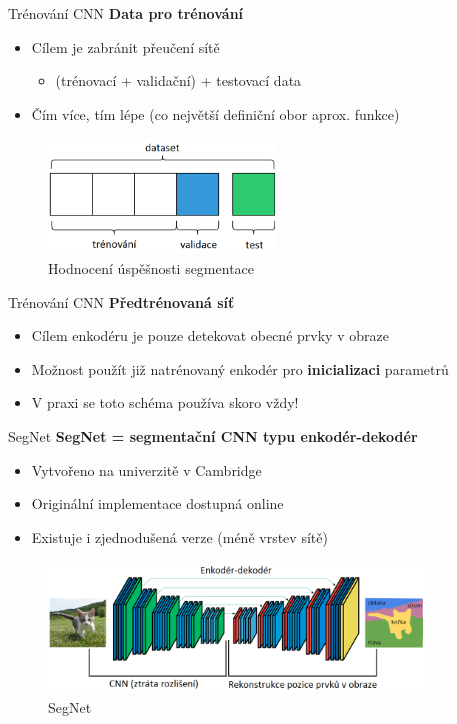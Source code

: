 \documentclass[aspectratio=1610]{beamer}
\begin{document}
\begin{frame}{Trénování CNN}
\textbf{Data pro trénování}
\begin{itemize}
	\item Cílem je zabránit přeučení sítě
	\begin{itemize}
		\item (trénovací + validační) + testovací data
	\end{itemize}
	\item Čím více, tím lépe (co největší definiční obor aprox. funkce)
\end{itemize}
\begin{figure}[h]
	\begin{center}
		\includegraphics[width=6cm, keepaspectratio]{dataset.png}
	\end{center}
	\caption{Hodnocení úspěšnosti segmentace} 	
\end{figure}

\end{frame}
\begin{frame}{Trénování CNN}
\textbf{Předtrénovaná síť}
\begin{itemize}
	\item Cílem enkodéru je pouze detekovat obecné prvky v obraze
	\item Možnost použít již natrénovaný enkodér pro \textbf{inicializaci} parametrů
	\item V praxi se toto schéma používa skoro vždy!
\end{itemize}
\end{frame}
\begin{frame}{SegNet}
\textbf{SegNet = segmentační CNN typu enkodér-dekodér}
\begin{itemize}
	\item Vytvořeno na univerzitě v Cambridge
	\item Originální implementace dostupná online	
	\item Existuje i zjednodušená verze (méně vrstev sítě)
\end{itemize}
\begin{figure}[h]
	\begin{center}
		\includegraphics[width=10cm, keepaspectratio]{segnet.png}
	\end{center}
	\caption{SegNet} 	
\end{figure}
\end{frame}
\end{document}
